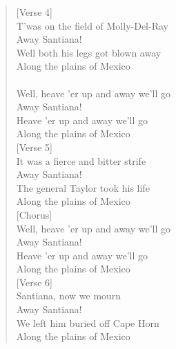 \documentclass[11pt]{article}
\begin{document}
\begin{verse}
\vspace*{1em}
[Verse 4]\\
T'was on the field of Molly-Del-Ray\\
Away Santiana!\\
Well both his legs got blown away\\
Along the plains of Mexico\\
[Chorus]\\
Well, heave 'er up and away we'll go\\
Away Santiana!\\
Heave 'er up and away we'll go\\
Along the plains of Mexico\\
\vspace*{1em}
[Verse 5]\\
It was a fierce and bitter strife\\
Away Santiana!\\
The general Taylor took his life\\
Along the plains of Mexico\\
\vspace*{1em}
[Chorus]\\
Well, heave 'er up and away we'll go\\
Away Santiana!\\
Heave 'er up and away we'll go\\
Along the plains of Mexico\\
\vspace*{1em}
[Verse 6]\\
Santiana, now we mourn\\
Away Santiana!\\
We left him buried off Cape Horn\\
Along the plains of Mexico\\
\end{verse}
\clearpage
\end{document}
